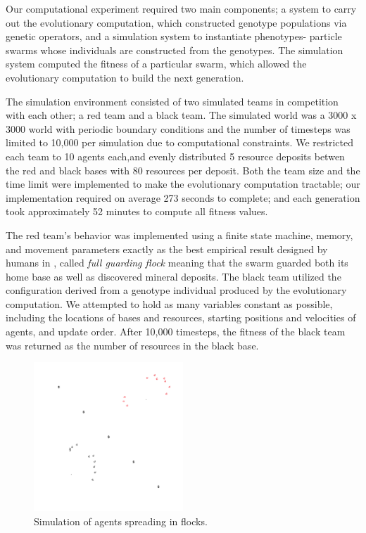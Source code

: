 \documentclass[12pt,journal,compsoc]{IEEEtran}
\begin{document}
Our computational experiment required two main components; a system to carry out the evolutionary computation, which constructed genotype populations via genetic operators, and a simulation system to instantiate phenotypes- particle swarms whose individuals are constructed from the genotypes. The simulation system computed the fitness of a particular swarm, which allowed the evolutionary computation to build the next generation.

The simulation environment consisted of two simulated teams in competition with each other; a red team and a black team. The simulated world was a 3000 x 3000 world with periodic boundary conditions and the number of timesteps was limited to 10,000 per simulation due to computational constraints. We restricted each team to 10 agents each,and evenly distributed 5 resource deposits betwen the red and black bases with 80 resources per deposit. Both the team size and the time limit were implemented to make the evolutionary computation tractable; our implementation required on average 273 seconds to complete; and each generation took approximately 52 minutes to compute all fitness values.

The red team's behavior was implemented using a finite state machine, memory, and movement parameters exactly as the best empirical result designed by humans in \cite{rodriguez2004extending}, called \textit{full guarding flock} meaning that the swarm guarded both its home base as well as discovered mineral deposits. The black team utilized the configuration derived from a genotype individual produced by the evolutionary computation. We attempted to hold as many variables constant as possible, including the locations of bases and resources, starting positions and velocities of agents, and update order. After 10,000 timesteps, the fitness of the black team was returned as the number of resources in the black base.

\begin{figure}[h!]
    \centering
        \includegraphics[width=0.5\textwidth]{figures/simulation}
    \caption{Simulation of agents spreading in flocks.}
\end{figure}
\end{document}
